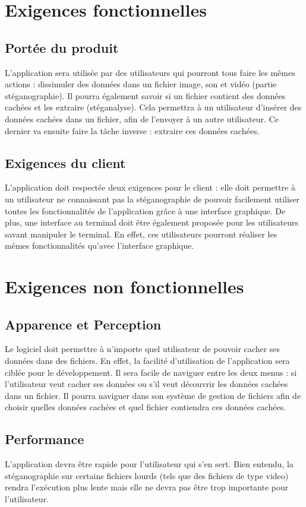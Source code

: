 \documentclass[11pt]{article}
\begin{document}
\section{Exigences fonctionnelles}
\subsection{Portée du produit}
L'application sera utilisée par des utilisateurs qui pourront tous faire les mêmes actions : dissimuler des données dans un fichier image, son et vidéo (partie stéganographie). 
Il pourra également savoir si un fichier contient des données cachées et les extraire (stéganalyse). 
Cela permettra à un utilisateur d'insérer des données cachées dans un fichier, afin de l'envoyer à un autre utilisateur. Ce dernier va ensuite faire la tâche inverse : extraire ces données cachées. 

\subsection{Exigences du client}
L'application doit respectée deux exigences pour le client : elle doit permettre à un utilisateur ne connaissant pas la stéganographie de pouvoir facilement utiliser toutes les fonctionnalités de 
l'application grâce à une interface graphique. De plus, une interface au terminal doit être également proposée pour les utilisateurs savant manipuler le terminal. En effet, ces utilisateurs pourront réaliser les mêmes fonctionnalités qu'avec l'interface graphique. 

\section{Exigences non fonctionnelles}
\subsection{Apparence et Perception}
Le logiciel doit permettre à n'importe quel utilisateur de pouvoir cacher ses données dans des fichiers. En effet, la facilité d'utilisation de l'application sera ciblée pour le développement. 
Il sera facile de naviguer entre les deux menus : si l'utilisateur veut cacher ses données ou s'il veut découvrir les données cachées dans un fichier. 
Il pourra naviguer dans son système de gestion de fichiers afin de choisir quelles données cachées et quel fichier contiendra ces données cachées. 

\subsection{Performance}
L'application devra être rapide pour l'utilisateur qui s'en sert. Bien entendu, la stéganographie sur certains fichiers lourds (tels que des fichiers de type video) rendra l'exécution plus lente 
mais elle ne devra pas être trop importante pour l'utilisateur. 
\end{document}
